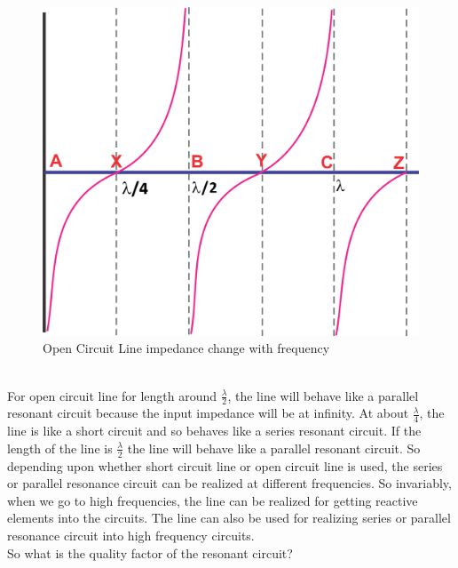 \begin{figure}[h]
\centering
\includegraphics[scale=0.4]{./graphics/group10diagram14}
\caption{Open Circuit Line impedance change with frequency}
\end{figure}\\For open circuit line for length around $ \frac{\lambda}{2} $, the line will behave like a parallel resonant circuit because the input impedance will be at infinity. At about $ \frac{\lambda}{4} $, the line is like a short circuit and so behaves like a series resonant circuit. If the length of the line is $ \frac{\lambda}{2} $ the line will behave like a parallel resonant circuit.
So depending upon whether short circuit line or open circuit line is used, the series or parallel resonance circuit can be realized at different frequencies. So invariably, when we go to high frequencies, the line can be realized for getting reactive elements into the circuits. The line can also be used for realizing series or parallel resonance circuit into high frequency circuits.\\
So what is the quality factor of the resonant circuit?

